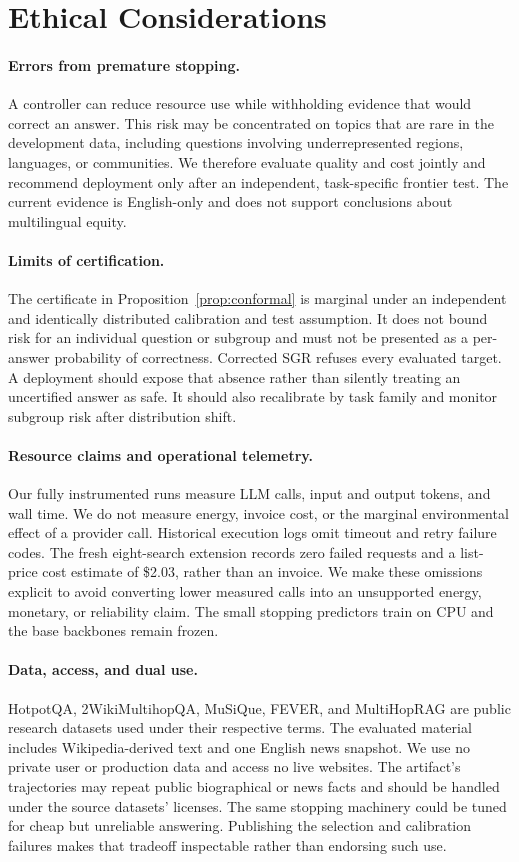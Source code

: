\section*{Ethical Considerations}

\paragraph{Errors from premature stopping.}
A controller can reduce resource use while withholding evidence that would
correct an answer. This risk may be concentrated on topics that are rare in
the development data, including questions involving underrepresented regions,
languages, or communities. We therefore evaluate quality and cost jointly and
recommend deployment only after an independent, task-specific frontier test.
The current evidence is English-only and does not support conclusions about
multilingual equity.

\paragraph{Limits of certification.}
The certificate in Proposition~\ref{prop:conformal} is marginal under an
independent and identically distributed calibration and test assumption. It
does not bound risk for an individual question or subgroup and must not be
presented as a per-answer probability of correctness. Corrected SGR refuses
every evaluated target. A deployment should expose that absence rather than
silently treating an uncertified answer as safe. It should also recalibrate by
task family and monitor subgroup risk after distribution shift.

\paragraph{Resource claims and operational telemetry.}
Our fully instrumented runs measure LLM calls, input and output tokens, and wall time. We do
not measure energy, invoice cost, or the marginal environmental effect of a
provider call. Historical execution logs omit timeout and retry failure codes. The fresh
eight-search extension records zero failed requests and a list-price cost
estimate of \$2.03, rather than an invoice. We make these omissions explicit to
avoid converting lower measured calls into an unsupported energy, monetary,
or reliability claim. The small stopping predictors train on CPU and the base
backbones remain frozen.

\paragraph{Data, access, and dual use.}
HotpotQA, 2WikiMultihopQA, MuSiQue, FEVER, and MultiHopRAG are public research
datasets used under their respective terms. The evaluated material includes
Wikipedia-derived text and one English news snapshot. We use no private user
or production data and access no live websites. The artifact's trajectories may
repeat public biographical or news facts and should be handled under the
source datasets' licenses. The same stopping machinery could be tuned for
cheap but unreliable answering. Publishing the selection and calibration
failures makes that tradeoff inspectable rather than endorsing such use.

